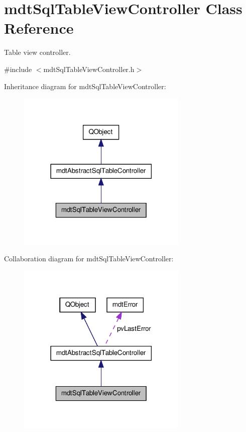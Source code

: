 \hypertarget{classmdt_sql_table_view_controller}{\section{mdt\-Sql\-Table\-View\-Controller Class Reference}
\label{classmdt_sql_table_view_controller}
}


Table view controller.  




{\ttfamily \#include $<$mdt\-Sql\-Table\-View\-Controller.\-h$>$}



Inheritance diagram for mdt\-Sql\-Table\-View\-Controller\-:\nopagebreak
\begin{figure}[H]
\begin{center}
\leavevmode
\includegraphics[width=230pt]{classmdt_sql_table_view_controller__inherit__graph}
\end{center}
\end{figure}


Collaboration diagram for mdt\-Sql\-Table\-View\-Controller\-:\nopagebreak
\begin{figure}[H]
\begin{center}
\leavevmode
\includegraphics[width=230pt]{classmdt_sql_table_view_controller__coll__graph}
\end{center}
\end{figure}
